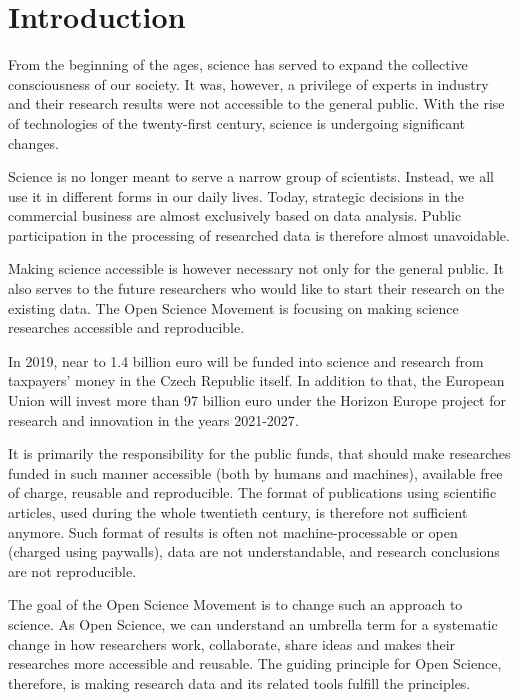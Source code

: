 \chapter{Introduction}\label{cptr:introduction}

From the beginning of the ages, science has served to expand the collective consciousness of our society.
It was, however, a privilege of experts in industry and their research results were not accessible to the general public.
With the rise of technologies of the twenty-first century, science is undergoing significant changes.

Science is no longer meant to serve a narrow group of scientists.
Instead, we all use it in different forms in our daily lives.
Today, strategic decisions in the commercial business are almost exclusively based on data analysis.
Public participation in the processing of researched data is therefore almost unavoidable.

Making science accessible is however necessary not only for the general public.
It also serves to the future researchers who would like to start their research on the existing data.
The Open Science Movement is focusing on making science researches accessible and reproducible.

In 2019, near to 1.4 billion euro will be funded into science and research from taxpayers' money in the Czech Republic itself\cite{rvvi-budget}.
In addition to that, the European Union will invest more than 97 billion euro under the Horizon Europe project for research and innovation in the years 2021-2027\cite{euc-horizon-budget}.

It is primarily the responsibility for the public funds, that should make researches funded in such manner accessible (both by humans and machines), available free of charge, reusable and reproducible.
The format of publications using scientific articles, used during the whole twentieth century, is therefore not sufficient anymore.
Such format of results is often not machine-processable or open (charged using paywalls), data are not understandable, and research conclusions are not reproducible.

The goal of the Open Science Movement is to change such an approach to science.
As Open Science, we can understand an umbrella term for a systematic change in how researchers work, collaborate, share ideas and makes their researches more accessible and reusable.
The guiding principle for Open Science, therefore, is making research data and its related tools fulfill the  principles.

